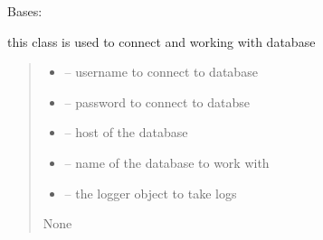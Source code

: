 \documentclass[letterpaper,10pt,english]{sphinxmanual}
\begin{document}
\begin{savenotes}\begin{fulllineitems}
\label{\detokenize{setting/database:oxin.database.dataBase}}
\pysigstartsignatures
{}
\pysigstopsignatures
\sphinxAtStartPar
Bases: 

\sphinxAtStartPar
this class is used to connect and working with database
\begin{quote}\begin{description}
\begin{itemize}
\item {} 
\sphinxAtStartPar
{} – username to connect to database

\item {} 
\sphinxAtStartPar
{} – password to connect to databse

\item {} 
\sphinxAtStartPar
{} – host of the database

\item {} 
\sphinxAtStartPar
{} – name of the database to work with

\item {} 
\sphinxAtStartPar
{} – the logger object to take logs

\end{itemize}

\sphinxAtStartPar
None

\end{description}\end{quote}


\end{fulllineitems}
\end{savenotes}
\end{document}
